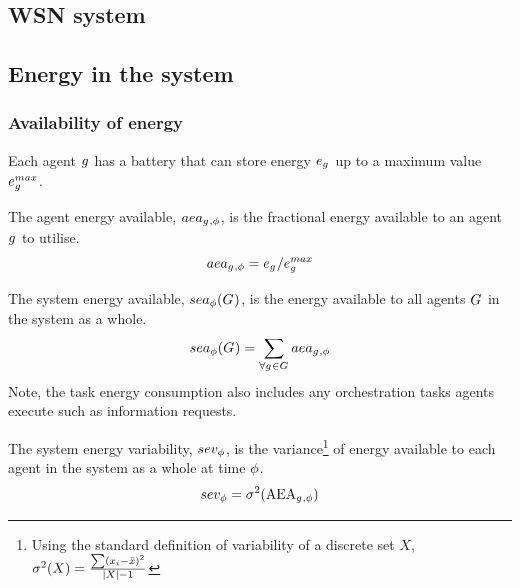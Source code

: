 \subsection{WSN system}

\subsection{Energy in the system}

\subsubsection{Availability of energy}

Each agent $g_{}^{}$ has a battery that can store energy $\varEnergy{}{}$ up to a maximum value $\varEnergyMax{}{}$.

\begin{definition}
	The agent energy available, $aea_{g_{}^{},\phi}$, is the fractional energy available to an agent $g_{}^{}$ to utilise.
	\begin{equation}
		\varAgentEnergyAvailable{}{} = \varEnergy{}{} / \varEnergyMax{}{}
	\end{equation}
\end{definition}

\begin{definition}
	The system energy available, $\functionSystemEnergyAvailable{}{}$, is the energy available to all agents $G_{}^{}$ in the system as a whole.
	\begin{equation}
		\functionSystemEnergyAvailable{}{} 
		= \sum_{\forall \varAgent{}{} \in \setAgents{}{}} \varAgentEnergyAvailable{\varAgent{i}{}}{}
	\end{equation}
	Note, the task energy consumption also includes any orchestration tasks agents execute such as information requests.
\end{definition}

\begin{definition}
	The system energy variability, $sev_{\phi}$, is the variance\footnote{Using the standard definition of variability of a discrete set $X$, $\sigma^2(X) = \frac{\sum (x_i - \bar{x})^2}{\lvert X \rvert-1}$} of energy available to each agent in the system as a whole at time $\phi$.
	\begin{equation}
		sev_{\phi} 
		= \sigma^2(\mathrm{AEA}_{g_{}^{},\phi})
	\end{equation}
\end{definition}

